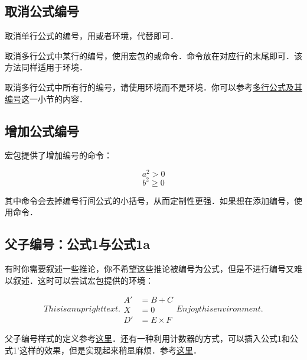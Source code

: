 \subsection{取消公式编号}
取消单行公式的编号，用\latexline{[\char`\\]}或者环境，代替即可．

取消多行公式中某行的编号，使用宏包的或命令．命令放在对应行的末尾即可．该方法同样适用于环境．

取消多行公式中所有行的编号，请使用环境而不是环境．你可以参考\hyperref[subsec:multieqnum]{多行公式及其编号}这一小节的内容．

\subsection{增加公式编号}
宏包提供了增加编号的命令：

\begin{codeshow}
\[a^2>0 \tag{$\star$}\]
\begin{equation}
b^2 \geqslant 0
\tag*{[Axiom]}
\end{equation}
\end{codeshow}

其中命令会去掉编号行间公式的小括号，从而定制性更强．如果想在添加编号，使用命令．

\subsection{父子编号：公式1与公式1a}
有时你需要叙述一些推论，你不希望这些推论被编号为公式，但是不进行编号又难以叙述．这时可以尝试宏包提供的环境：

\begin{codeshow}
\begin{subequations}
This is an upright text.
\begin{align}
A' &=B+C \\
X &=0 \nonumber \\
D' &=E \times F
\end{align}
Enjoy this environment.
\end{subequations}
\end{codeshow}

父子编号样式的定义参考\hyperref[code:parenteqnum]{这里}．还有一种利用计数器的方式，可以插入公式1和公式1'这样的效果，但是实现起来稍显麻烦．参考\hyperref[code:eq1plus]{这里}．

